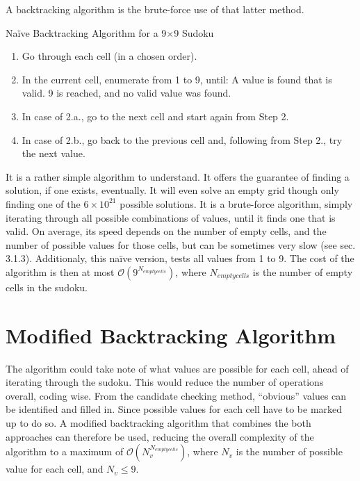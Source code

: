 \documentclass[12pt]{report} %
\begin{document}
A backtracking algorithm is the brute-force use of that latter method\cite{cornell_sudoku}.

\begin{definitionbox}{Naïve Backtracking Algorithm for a 9$\times$9 Sudoku}

  \begin{enumerate}
    \item Go through each cell (in a chosen order).
    \item In the current cell, enumerate from 1 to 9, until:
     A value is found that is valid.
     9 is reached, and no valid value was found.
    \item In case of 2.a., go to the next cell and start again from Step 2.
    \item In case of 2.b., go back to the previous cell and, following from Step 2., try the next value.
  \end{enumerate}

\end{definitionbox}

\vspace*{1\baselineskip}
It is a rather simple algorithm to understand. It offers the guarantee of finding a solution, if one exists, eventually. It will even solve an empty grid though only finding one of the $6 \times 10^{21}$ possible solutions\cite{cornell_sudoku3}.
It is a brute-force algorithm, simply iterating through all possible combinations of values, until it finds one that is valid. On average, its speed depends on the number of empty cells, and the number of possible values for those cells, but can be sometimes very slow (see sec. 3.1.3). Additionaly, this naïve version, tests all values from 1 to 9. The cost of the algorithm is then at most $\mathcal{O}(9^{N_{empty cells}})$, where $N_{empty cells}$ is the number of empty cells in the sudoku.

\section{Modified Backtracking Algorithm}

The algorithm could take note of what values are possible for each cell, ahead of iterating through the sudoku. This would reduce the number of operations overall, coding wise.
From the candidate checking method, ``obvious'' values can be identified and filled in. Since possible values for each cell have to be marked up to do so. A modified backtracking algorithm that combines the both approaches can therefore be used, reducing the overall complexity of the algorithm to a maximum of $\mathcal{O}(N_{v}^{N_{empty cells}})$, where $N_{v}$ is the number of possible value for each cell, and $N_{v}\leq 9$.
\end{document}
